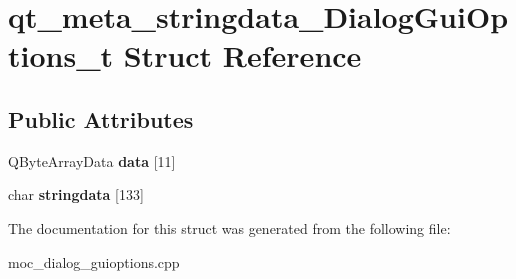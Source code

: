 \hypertarget{structqt__meta__stringdata__DialogGuiOptions__t}{\section{qt\-\_\-meta\-\_\-stringdata\-\_\-\-Dialog\-Gui\-Options\-\_\-t Struct Reference}
\label{structqt__meta__stringdata__DialogGuiOptions__t}
}
\subsection*{Public Attributes}
\begin{DoxyCompactItemize}
\item 
\hypertarget{structqt__meta__stringdata__DialogGuiOptions__t_a54720d4f63de70a7d458720d47d20118}{Q\-Byte\-Array\-Data {\bfseries data} \mbox{[}11\mbox{]}}\label{structqt__meta__stringdata__DialogGuiOptions__t_a54720d4f63de70a7d458720d47d20118}

\item 
\hypertarget{structqt__meta__stringdata__DialogGuiOptions__t_ac7d4ec93c7fa972867715797589be1ca}{char {\bfseries stringdata} \mbox{[}133\mbox{]}}\label{structqt__meta__stringdata__DialogGuiOptions__t_ac7d4ec93c7fa972867715797589be1ca}

\end{DoxyCompactItemize}


The documentation for this struct was generated from the following file\-:\begin{DoxyCompactItemize}
\item 
moc\-\_\-dialog\-\_\-guioptions.\-cpp\end{DoxyCompactItemize}

